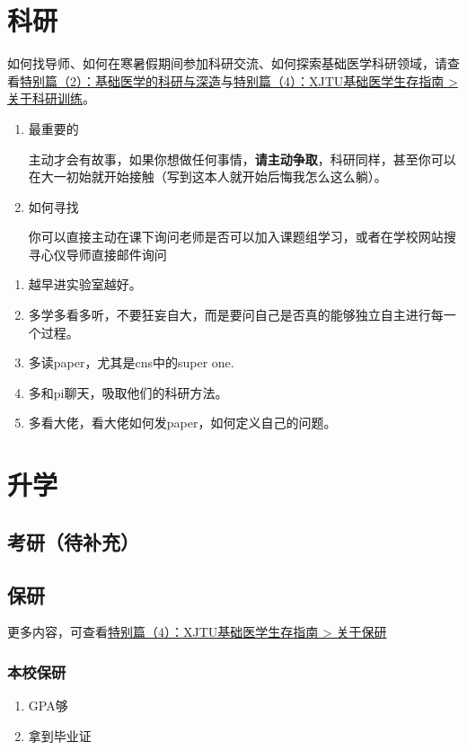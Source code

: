 \documentclass[zihao=-4,fontset=none]{Beautybook-CN}
\begin{document}
\chapter{科研}
\begin{example}
    如何找导师、如何在寒暑假期间参加科研交流、如何探索基础医学科研领域，请查看\hyperref[sp2]{特别篇（2）：基础医学的科研与深造}与\hyperref[basexp]{特别篇（4）：XJTU基础医学生存指南 > 关于科研训练}。
\end{example}
\begin{enumerate}
    \item 最重要的

    主动才会有故事，如果你想做任何事情，\textbf{请主动争取}，科研同样，甚至你可以在大一初始就开始接触（写到这本人就开始后悔我怎么这么躺）。
    \item 如何寻找

    你可以直接主动在课下询问老师是否可以加入课题组学习，或者在学校网站搜寻心仪导师直接邮件询问
\end{enumerate}

\begin{example}[title=小雷的建议]

    \begin{enumerate}
\item 越早进实验室越好。
\item 多学多看多听，不要狂妄自大，而是要问自己是否真的能够独立自主进行每一个过程。
\item 多读paper，尤其是cns中的super one.
\item 多和pi聊天，吸取他们的科研方法。
\item 多看大佬，看大佬如何发paper，如何定义自己的问题。
\end{enumerate}
\end{example}
\chapter{升学}
\section{考研（待补充）}
\section{保研}
\begin{example}
    更多内容，可查看\hyperref[basebaoyan]{特别篇（4）：XJTU基础医学生存指南 > 关于保研}
\end{example}
\subsection{本校保研}
\begin{enumerate}
\item GPA够
\item 拿到毕业证
\end{enumerate}
\end{document}

